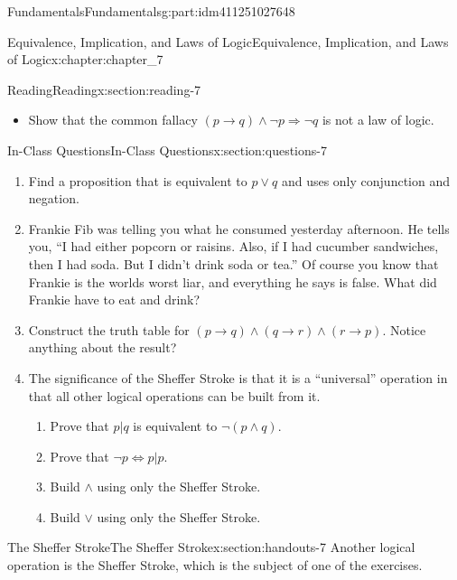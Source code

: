 \documentclass[oneside,10pt,]{book}
\numberwithin{equation}{section}
\begin{document}
\begin{partptx}{Fundamentals}{}{Fundamentals}{}{}{g:part:idm411251027648}
\begin{chapterptx}{Equivalence, Implication, and Laws of Logic}{}{Equivalence, Implication, and Laws of Logic}{}{}{x:chapter:chapter_7}
\begin{sectionptx}{Reading}{}{Reading}{}{}{x:section:reading-7}
\begin{itemize}[label=\textbullet]
\begin{enumerate}[label=(\alph*)]
\end{enumerate}
%
\item{}Show that the common fallacy \((p\to  q) \land  \neg p \Rightarrow  \neg q\) is not a law of logic.%
\end{itemize}
%
\end{sectionptx}
%
%
\typeout{************************************************}
\typeout{************************************************}
%
\begin{sectionptx}{In-Class Questions}{}{In-Class Questions}{}{}{x:section:questions-7}
%
\begin{enumerate}[label=\arabic*.]
\item{}Find a proposition that is equivalent to \(p \lor  q\) and uses only conjunction and negation.%
\item{}Frankie Fib was telling you what he consumed yesterday afternoon. He tells you, ``I had either popcorn or raisins. Also, if I had cucumber sandwiches, then I had soda. But I didn't drink soda or tea.'' Of course you know that Frankie is the worlds worst liar, and everything he says is false. What did Frankie have to eat and drink?%
\item{}Construct the truth table for \((p \rightarrow q) \land (q \rightarrow r) \land (r \rightarrow p)\).   Notice anything about the result?%
\item{}The significance of the Sheffer Stroke is that it is a ``universal'' operation in that all other logical operations can be built from it.%
\begin{enumerate}[label=(\alph*)]
\item{}Prove that \(p | q\) is equivalent to \(\neg (p \land  q)\).%
\item{}Prove that \(\neg p \Leftrightarrow  p | p\).%
\item{}Build \(\land\) using only the Sheffer Stroke.%
\item{}Build \(\lor\) using only the Sheffer Stroke.%
\end{enumerate}
%
\end{enumerate}
%
\end{sectionptx}
%
%
\typeout{************************************************}
\typeout{************************************************}
%
\begin{sectionptx}{The Sheffer Stroke}{}{The Sheffer Stroke}{}{}{x:section:handouts-7}
%
Another logical operation is the Sheffer Stroke, which is the subject of one of the exercises.%

\end{sectionptx}
\end{chapterptx}
\end{partptx}
\end{document}
